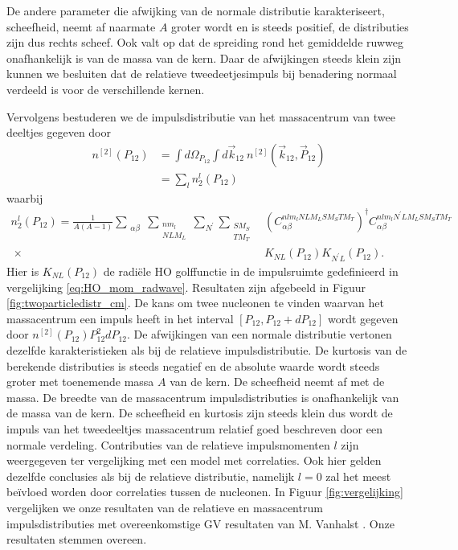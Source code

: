 \documentclass[11pt,twoside]{book}
\begin{document}
De andere parameter die afwijking van de normale distributie karakteriseert, scheefheid, neemt af naarmate $A$ groter wordt en is steeds positief, de distributies zijn dus rechts scheef. 
Ook valt op dat de spreiding rond het gemiddelde ruwweg onafhankelijk is van de massa van de kern. Daar de afwijkingen steeds klein zijn kunnen we besluiten dat de relatieve tweedeetjesimpuls bij benadering normaal verdeeld is voor de verschillende kernen.

Vervolgens bestuderen we de impulsdistributie van het massacentrum van twee deeltjes gegeven door 
\begin{align} \label{eq:cm_two}
n^{[2]}(P_{12}) & = \int d\Omega_{P_{12}}\int d\vec{k}_{12}\ n^{[2]}(\vec{k}_{12},\vec{P}_{12}) \nonumber \\
				 & = \sum_{l}  n_2^{l}(P_{12})
\end{align}
waarbij
\begin{align*} 
n_2^{l}(P_{12}) = \frac{1}{A(A-1)} \sum_{\substack{\alpha \beta }} \sum_{\substack{nm_l \\ NLM_L}} \sum_{N^{\prime}} \sum_{\substack{S M_S \\T M_T}} &  \left( C_{\alpha \beta}^{nlm_l NLM_L  S M_S T M_T} \right)^\dagger  C_{\alpha \beta}^{ n lm_l N^{\prime}LM_L  S M_S T M_T} \\ \ \times & K_{NL}(P_{12}) K_{N^{\prime} L}(P_{12}). 
\end{align*}
Hier is $K_{NL}(P_{12})$ de radi\"{e}le HO golffunctie in de impulsruimte gedefinieerd in vergelijking \eqref{eq:HO_mom_radwave}.
Resultaten zijn afgebeeld in Figuur \ref{fig:twoparticledistr_cm}. De kans om twee nucleonen te vinden waarvan het massacentrum een impuls heeft in het interval $[ P_{12}, P_{12}+ dP_{12} ]$ wordt gegeven door $n^{[2]}(P_{12})P_{12}^2dP_{12}$. De afwijkingen van een normale distributie vertonen dezelfde karakteristieken als bij de relatieve impulsdistributie. De kurtosis van de berekende distributies is steeds negatief en de absolute waarde wordt steeds groter met toenemende massa $A$ van de kern. De scheefheid neemt af met de massa. De breedte van de massacentrum impulsdistributies is onafhankelijk van de massa van de kern. De scheefheid en kurtosis zijn steeds klein dus wordt de impuls van het tweedeeltjes massacentrum relatief goed beschreven door een normale verdeling.
Contributies van  de relatieve impulsmomenten $l$ zijn weergegeven ter vergelijking met een model met correlaties. Ook hier gelden dezelfde conclusies als bij de relatieve distributie, namelijk $l=0$ zal het meest be\"{i}vloed worden door correlaties tussen de nucleonen. 
In Figuur \ref{fig:vergelijking} vergelijken we onze resultaten van de relatieve en massacentrum impulsdistributies met overeenkomstige GV resultaten van M. Vanhalst \cite{maarten}. Onze resultaten stemmen overeen.
\end{document}
